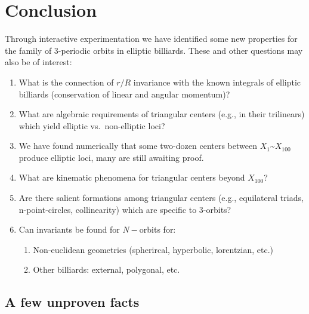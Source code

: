 \documentclass[]{article}
\providecommand{\tightlist}{%
  \setlength{\itemsep}{0pt}\setlength{\parskip}{0pt}}
\begin{document}
\hypertarget{conclusion}{%
\section{Conclusion}\label{conclusion}}

Through interactive experimentation we have identified some new properties for the family of 3-periodic orbits in elliptic billiards. These and other questions may also be of interest:

\begin{enumerate}
\def\labelenumi{\arabic{enumi}.}
\tightlist
\item
  What is the connection of \(r/R\) invariance with the known integrals of elliptic billiards (conservation of linear and angular momentum)?
\item
  What are algebraic requirements of triangular centers (e.g., in their trilinears) which yield elliptic vs.~non-elliptic loci?
\item
  We have found numerically that some two-dozen centers between \(X_1\)\textasciitilde{}\(X_{100}\) produce elliptic loci, many are still awaiting proof.
\item
  What are kinematic phenomena for triangular centers beyond \(X_{100}\)?
\item
  Are there salient formations among triangular centers (e.g., equilateral triads, n-point-circles, collinearity) which are specific to 3-orbits?
\item
  Can invariants be found for \(N-\)orbits for:

  \begin{enumerate}
  \def\labelenumii{\arabic{enumii}.}
  \tightlist
  \item
    Non-euclidean geometries (spherircal, hyperbolic, lorentzian, etc.)
  \item
    Other billiards: external, polygonal, etc.
  \end{enumerate}
\end{enumerate}

\hypertarget{a-few-unproven-facts}{%
\subsection{A few unproven facts}\label{a-few-unproven-facts}}
\end{document}

